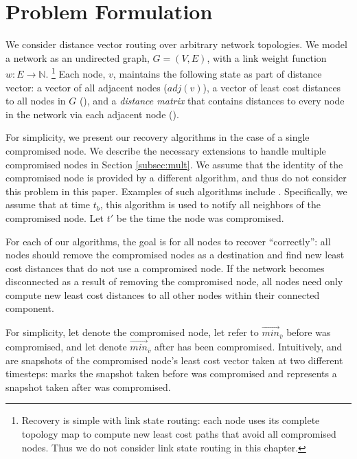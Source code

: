 \section{Problem Formulation}
\label{sec:problem}

We consider distance vector routing \cite{Gall87} over arbitrary network topologies. We model a network as an undirected graph, $G=(V,E)$,
with a link weight function $w: E \rightarrow \mathbb{N}$.
{\footnote {\small Recovery is simple with link state routing: each node uses its complete topology map to compute new least cost paths that avoid all compromised nodes.
Thus we do not consider link state routing in this chapter.}}
Each node, $v$, maintains the following state as part of distance vector: a vector of all adjacent nodes ($adj(v)$), a vector of least cost distances to all
nodes in $G$ (\minvvs), and a \emph{distance matrix} that contains distances to every node in the network via each adjacent node (\dmatrixvs). 

For simplicity, we present our recovery algorithms in the case of a single compromised node.
We describe the necessary extensions to handle multiple compromised nodes in Section \ref{subsec:mult}.
We assume that the identity of the compromised node is provided by a different algorithm, and thus do not consider this problem in this paper.
Examples of such algorithms include \cite{Arini,Feam,Vishal02,Pad03,Paul02}. %
Specifically, we assume that at time $t_b$, this algorithm is used to notify all neighbors of the 
compromised node. Let $t'$ be the time the node was compromised.

For each of our algorithms, the goal is for all nodes to recover ``correctly'': all nodes should remove the compromised nodes as a destination and find
new least cost distances that do not use a compromised node. If the network becomes disconnected as a result of removing the compromised node, all
nodes need only compute new least cost distances to all other nodes within their connected component.

For simplicity, let \bad denote the compromised node, let \oldvector refer to $\overrightarrow{min}_{\overline{v}}$ 
before \bad was compromised, and let \badvector denote $\overrightarrow{min}_{\overline{v}}$ after \bad has been compromised.
Intuitively, \oldvector and \badvector are snapshots of the compromised node's least cost vector taken at two different timesteps: \oldvector marks the snapshot taken before \bad was compromised and 
\badvector represents a snapshot taken after \bad was compromised.


